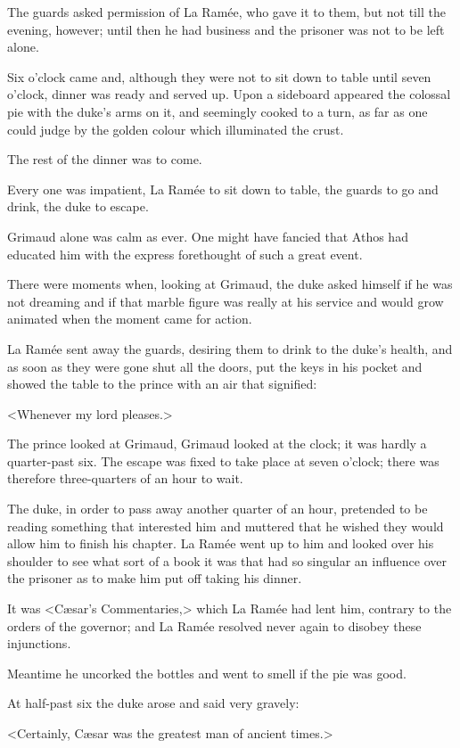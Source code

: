 The guards asked permission of La Ramée, who gave it to them, but not till the evening, however; until then he had business and the prisoner was not to be left alone.

Six o'clock came and, although they were not to sit down to table until seven o'clock, dinner was ready and served up. Upon a sideboard appeared the colossal pie with the duke's arms on it, and seemingly cooked to a turn, as far as one could judge by the golden colour which illuminated the crust.

The rest of the dinner was to come.

Every one was impatient, La Ramée to sit down to table, the guards to go and drink, the duke to escape.

Grimaud alone was calm as ever. One might have fancied that Athos had educated him with the express forethought of such a great event.

There were moments when, looking at Grimaud, the duke asked himself if he was not dreaming and if that marble figure was really at his service and would grow animated when the moment came for action.

La Ramée sent away the guards, desiring them to drink to the duke's health, and as soon as they were gone shut all the doors, put the keys in his pocket and showed the table to the prince with an air that signified:

<Whenever my lord pleases.>

The prince looked at Grimaud, Grimaud looked at the clock; it was hardly a quarter-past six. The escape was fixed to take place at seven o'clock; there was therefore three-quarters of an hour to wait.

The duke, in order to pass away another quarter of an hour, pretended to be reading something that interested him and muttered that he wished they would allow him to finish his chapter. La Ramée went up to him and looked over his shoulder to see what sort of a book it was that had so singular an influence over the prisoner as to make him put off taking his dinner.

It was <Cæsar's Commentaries,> which La Ramée had lent him, contrary to the orders of the governor; and La Ramée resolved never again to disobey these injunctions.

Meantime he uncorked the bottles and went to smell if the pie was good.

At half-past six the duke arose and said very gravely:

<Certainly, Cæsar was the greatest man of ancient times.>

